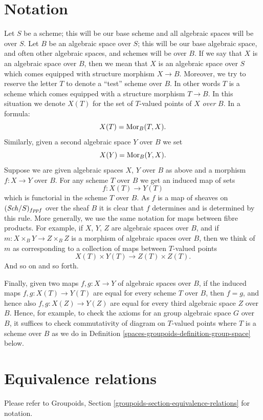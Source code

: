 \section{Notation}
\label{spaces-groupoids-section-notation}
Let $S$ be a scheme; this will be our base scheme and all algebraic spaces
will be over $S$. Let $B$ be an algebraic space over $S$; this will be our
base algebraic space, and often other algebraic spaces, and schemes will
be over $B$. If we say that $X$ is an algebraic space over $B$, then we
mean that $X$ is an algebraic space over $S$ which comes equipped with
structure morphism $X \to B$. Moreover, we try to reserve the letter $T$
to denote a ``test'' scheme over $B$. In other words $T$ is a scheme
which comes equipped with a structure morphism $T \to B$.
In this situation we denote $X(T)$ for the set of $T$-valued points of
$X$ {\it over} $B$. In a formula:
$$
X(T) = \operatorname{Mor}_B(T, X).
$$
Similarly, given a second algebraic space $Y$ over $B$ we set
$$
X(Y) = \operatorname{Mor}_B(Y, X).
$$
Suppose we are given algebraic spaces $X$, $Y$ over $B$ as above and a
morphism $f : X \to Y$ over $B$. For any scheme $T$ over $B$ we get an
induced map of sets
$$
f : X(T) \longrightarrow Y(T)
$$
which is functorial in the scheme $T$ over $B$.
As $f$ is a map of sheaves on $(\mathit{Sch}/S)_{fppf}$ over the
sheaf $B$ it is clear that $f$ determines and is determined by this rule.
More generally, we use the same notation for maps between fibre
products. For example, if
$X$, $Y$, $Z$ are algebraic spaces over $B$, and if
$m : X \times_B Y \to Z \times_B Z$ is
a morphism of algebraic spaces over $B$, then we think of $m$ as corresponding
to a collection of maps between $T$-valued points
$$
X(T) \times Y(T) \longrightarrow Z(T) \times Z(T).
$$
And so on and so forth.

\medskip\noindent
Finally, given two maps
$f, g : X \to Y$ of algebraic spaces over $B$, if the induced maps
$f, g : X(T) \to Y(T)$ are equal for every scheme $T$ over $B$, then
$f = g$, and hence also $f, g : X(Z) \to Y(Z)$ are equal for
every third algebraic space $Z$ over $B$. Hence, for example,
to check the axioms for an group algebraic space $G$ over $B$, it
suffices to check commutativity of diagram on $T$-valued points
where $T$ is a scheme over $B$ as we do in
Definition \ref{spaces-groupoids-definition-group-space}
below.

\section{Equivalence relations}
\label{spaces-groupoids-section-equivalence-relations}
Please refer to
Groupoids, Section \ref{groupoids-section-equivalence-relations}
for notation.

